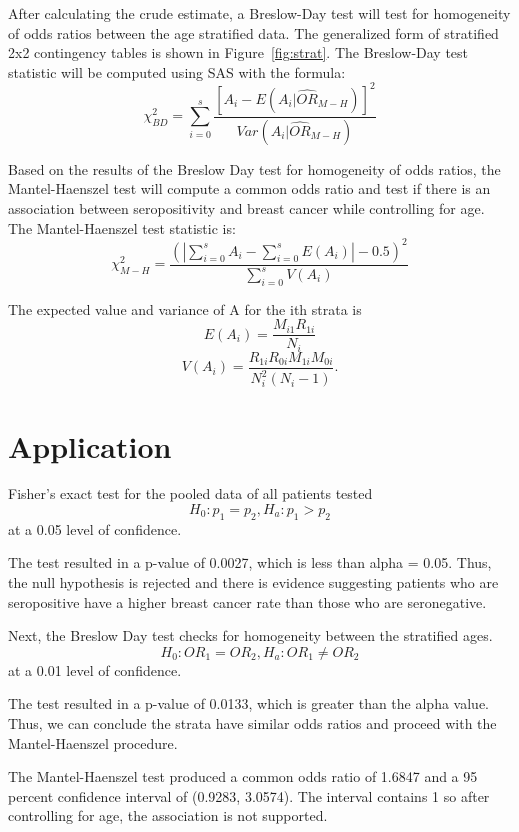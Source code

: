 \documentclass[12pt, titlepage]{article}
\begin{document}
After calculating the crude estimate, a Breslow-Day test will test for 
homogeneity of odds ratios between the age stratified data. The generalized
form of stratified 2x2 contingency tables is shown in Figure~\ref{fig:strat}.
The Breslow-Day test statistic will be computed using SAS with the formula:
\begin{equation}
  \chi_{BD}^2=\displaystyle\sum\limits_{i=0}^s\frac{[A_i-E(A_i|\hat{OR}_{M-H})]^2}{Var(A_i|\hat{OR}_{M-H})}
\end{equation}

Based on the results of the Breslow Day test for homogeneity of odds ratios,
the Mantel-Haenszel test will compute a common odds ratio and test if there 
is an association between seropositivity and breast cancer while controlling 
for age. The Mantel-Haenszel test statistic is:
\begin{equation}
  \chi_{M-H}^2=\frac{(|\sum\limits_{i=0}^s A_i - \sum\limits_{i=0}^sE(A_i)|-0.5)^2}
{\sum\limits_{i=0}^s V(A_i)}
\end{equation}

\vspace{1cm}

The expected value and variance of A for the ith strata is 
\[
  E(A_{i})=\frac{M_{i1}R_{1i}}{N_{i}} 
\]
\[
  V(A_{i})=\frac{R_{1i}R_{0i}M_{1i}M_{0i}}{N_i^2(N_{i}-1)}. 
\]


\section{Application}
\label{sec:app}
Fisher's exact test for the pooled data of all patients tested 
\[
H_{0}:p_{1}=p_{2}, H_{a}:p_{1}>p_{2}
\]
at a 0.05 level of confidence.

The test resulted in a p-value of 0.0027, which is less than 
alpha = 0.05. Thus, the null hypothesis is rejected and there 
is evidence suggesting patients who are seropositive have a
higher breast cancer rate than those who are seronegative.

Next, the Breslow Day test checks for homogeneity between the 
stratified ages. 
\[
H_{0}:OR_{1}=OR_{2}, H_{a}:OR_{1}\neq{OR_{2}}
\]
at a 0.01 level of confidence. 

The test resulted in a p-value of 0.0133, which is greater than
the alpha value. Thus, we can conclude the strata have similar
odds ratios and proceed with the Mantel-Haenszel procedure. 

The Mantel-Haenszel test produced a common odds ratio of 1.6847 and 
a 95 percent confidence interval of (0.9283, 3.0574). The interval
contains 1 so after controlling for age, the association is not supported.
\end{document}
